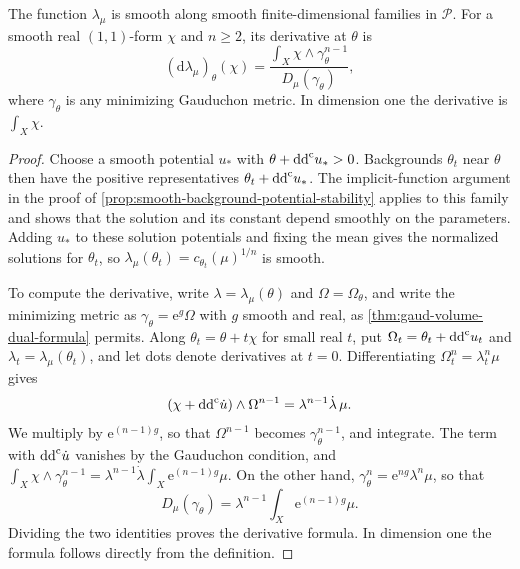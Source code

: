 \begin{proposition}\label{prop:gaud-volume-first-variation}
The function $\lambda_\mu$ is smooth along smooth finite-dimensional families in $\mathscr P$. For a smooth real $(1,1)$-form $\chi$ and $n\geq2$, its derivative at $\theta$ is
\[
 (\mathrm{d}\lambda_\mu)_\theta(\chi)
 =\frac{\displaystyle\int_X\chi\wedge\gamma_\theta^{n-1}}
        {D_\mu(\gamma_\theta)},
\]
where $\gamma_\theta$ is any minimizing Gauduchon metric. In dimension one the derivative is $\int_X\chi$.
\end{proposition}
\begin{proof}
Choose a smooth potential $u_*$ with $\theta+\mathrm{dd}^{\mathrm{c}} u_*>0$. Backgrounds $\theta_t$ near $\theta$ then have the positive representatives $\theta_t+\mathrm{dd}^{\mathrm{c}} u_*$. The implicit-function argument in the proof of \cref{prop:smooth-background-potential-stability} applies to this family and shows that the solution and its constant depend smoothly on the parameters. Adding $u_*$ to these solution potentials and fixing the mean gives the normalized solutions for $\theta_t$, so $\lambda_\mu(\theta_t)=c_{\theta_t}(\mu)^{1/n}$ is smooth.

To compute the derivative, write $\lambda=\lambda_\mu(\theta)$ and $\Omega=\Omega_\theta$, and write the minimizing metric as $\gamma_\theta=\mathrm{e}^g\Omega$ with $g$ smooth and real, as \cref{thm:gaud-volume-dual-formula} permits. Along $\theta_t=\theta+t\chi$ for small real $t$, put $\Omega_t=\theta_t+\mathrm{dd}^{\mathrm{c}} u_t$ and $\lambda_t=\lambda_\mu(\theta_t)$, and let dots denote derivatives at $t=0$. Differentiating $\Omega_t^n=\lambda_t^n\mu$ gives
\[
 (\chi+\mathrm{dd}^{\mathrm{c}}\dot u)\wedge\Omega^{n-1}
                   =\lambda^{n-1}\dot\lambda\,\mu.
\]
We multiply by $\mathrm{e}^{(n-1)g}$, so that $\Omega^{n-1}$ becomes $\gamma_\theta^{n-1}$, and integrate. The term with $\mathrm{dd}^{\mathrm{c}}\dot u$ vanishes by the Gauduchon condition, and $\int_X\chi\wedge\gamma_\theta^{n-1}=\lambda^{n-1}\dot\lambda\int_X\mathrm{e}^{(n-1)g}\mu$. On the other hand, $\gamma_\theta^n=\mathrm{e}^{ng}\lambda^n\mu$, so that
\[
 D_\mu(\gamma_\theta)
       =\lambda^{n-1}\int_X \mathrm{e}^{(n-1)g}\mu.
\]
Dividing the two identities proves the derivative formula. In dimension one the formula follows directly from the definition.
\end{proof}








